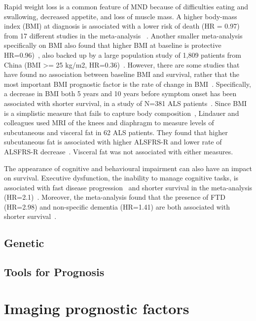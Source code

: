 Rapid weight loss is a common feature of MND because of difficulties eating and swallowing, decreased appetite, and loss of muscle mass. A higher body-mass index (BMI) at diagnosis is associated with a lower risk of death (HR = 0.97) from 17 different studies in the meta-analysis ~\cite{suPredictorsSurvivalPatients2021}.
Another smaller meta-analysis specifically on BMI also found that higher BMI at baseline is protective HR=0.96)~\cite{dardiotisBodyMassIndex2018}, also backed up by a large population study of 1,809 patients from China (BMI >= 25 kg/m2, HR=0.36)~\cite{gaoEpidemiologyFactorsPredicting2021}.
However, there are some studies that have found no association between baseline BMI and survival, rather that the most important BMI prognostic factor is the rate of change in BMI~\cite{jawaidDecreaseBodyMass2010}.
Specifically, a decrease in BMI both 5 years and 10 years before symptom onset has been associated with shorter survival, in a study of N=381 ALS patients~\cite{goutmanBodyMassIndex2023}.
Since BMI is a simplistic measure that fails to capture body composition~\cite{rothmanBMIrelatedErrorsMeasurement2008}, Lindauer and colleagues used MRI of the knees and diaphragm to measure levels of subcutaneous and visceral fat in 62 ALS patients.
They found that higher subcutaneous fat is associated with higher ALSFRS-R and lower rate of ALSFRS-R decrease~\cite{lindauerAdiposeTissueDistribution2013}. Visceral fat was not associated with either measures.

The appearance of cognitive and behavioural impairment can also have an impact on survival.
Executive dysfunction, the inability to manage cognitive tasks, is associated with fast disease progression~\cite{elaminExecutiveDysfunctionNegative2011} and shorter survival in the meta-analysis (HR=2.1)~\cite{suPredictorsSurvivalPatients2021}.
Moreover, the meta-analysis found that the presence of FTD (HR=2.98) and non-specific dementia (HR=1.41) are both associated with shorter survival~\cite{suPredictorsSurvivalPatients2021}.

\subsection{Genetic}

\subsection{Tools for Prognosis}

\section{Imaging prognostic factors}

